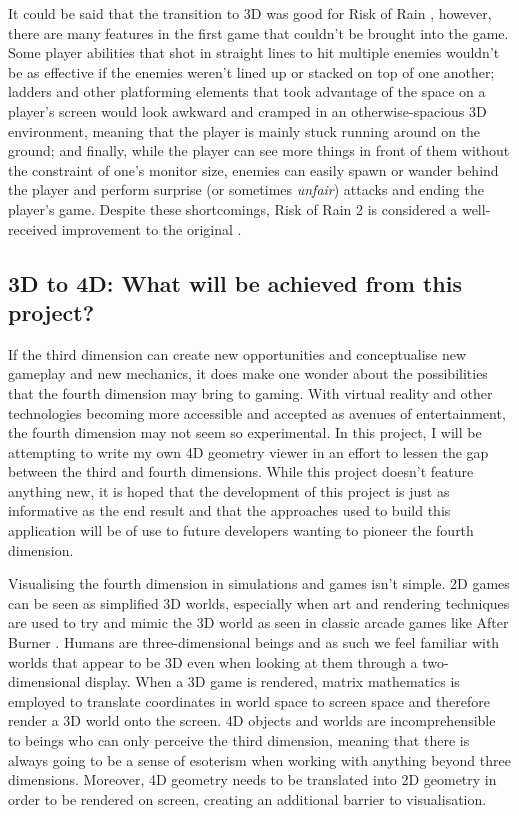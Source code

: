 \documentclass[11pt, a4paper]{article}
\begin{document}
It could be said that the transition to 3D was good for Risk of Rain \parencite*{riskofrain}, however, there are many features in the first game that couldn't be brought into the game. Some player abilities that shot in straight lines to hit multiple enemies wouldn't be as effective if the enemies weren't lined up or stacked on top of one another; ladders and other platforming elements that took advantage of the space on a player's screen would look awkward and cramped in an otherwise-spacious 3D environment, meaning that the player is mainly stuck running around on the ground; and finally, while the player can see more things in front of them without the constraint of one's monitor size, enemies can easily spawn or wander behind the player and perform surprise (or sometimes \emph{unfair}) attacks and ending the player's game. Despite these shortcomings, Risk of Rain 2 \parencite*{riskofrain2} is considered a well-received improvement to the original \parencite{riskofrain2steamreviews}.

\subsection{3D to 4D: What will be achieved from this project?}

If the third dimension can create new opportunities and conceptualise new gameplay and new mechanics, it does make one wonder about the possibilities that the fourth dimension may bring to gaming. With virtual reality and other technologies becoming more accessible and accepted as avenues of entertainment, the fourth dimension may not seem so experimental. In this project, I will be attempting to write my own 4D geometry viewer in an effort to lessen the gap between the third and fourth dimensions. While this project doesn't feature anything new, it is hoped that the development of this project is just as informative as the end result and that the approaches used to build this application will be of use to future developers wanting to pioneer the fourth dimension.

Visualising the fourth dimension in simulations and games isn't simple. 2D games can be seen as simplified 3D worlds, especially when art and rendering techniques are used to try and mimic the 3D world as seen in classic arcade games like After Burner \parencite{afterburner}. Humans are three-dimensional beings and as such we feel familiar with worlds that appear to be 3D even when looking at them through a two-dimensional display. When a 3D game is rendered, matrix mathematics is employed to translate coordinates in world space to screen space and therefore render a 3D world onto the screen. 4D objects and worlds are incomprehensible to beings who can only perceive the third dimension, meaning that there is always going to be a sense of esoterism when working with anything beyond three dimensions. Moreover, 4D geometry needs to be translated into 2D geometry in order to be rendered on screen, creating an additional barrier to visualisation.
\end{document}
